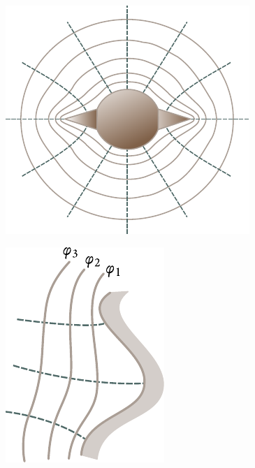 \begin{figure}[!htb]
	\begin{minipage}[t]{0.48\linewidth}
		\begin{center}
			\includegraphics[scale=1]{figures/ch_03/fig_3_2.pdf}
			\caption[]{}
			\label{fig:3_2}
		\end{center}
	\end{minipage}
	\hfill{ }%
	\begin{minipage}[t]{0.48\linewidth}
		\begin{center}
			\includegraphics[scale=1]{figures/ch_03/fig_3_3.pdf}
			\caption[]{}
			\label{fig:3_3}
		\end{center}
	\end{minipage}
\vspace{-0.4cm}
\end{figure}

